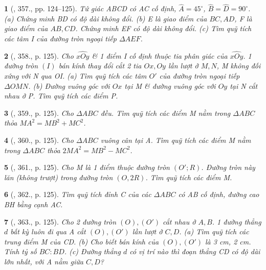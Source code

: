 \documentclass{article}
\newtheorem{baitoan}{}
\begin{document}
\begin{baitoan}[\cite{Binh_Toan_9_tap_2}, 357., pp. 124--125]
	Tứ giác ABCD có AC cố định, $\widehat{A} = 45^\circ$, $\widehat{B} = \widehat{D} = 90^\circ$. (a) Chứng minh BD có độ dài không đổi. (b) E là giao điểm của $BC,AD$, F là giao điểm của $AB,CD$. Chứng minh EF có độ dài không đổi. (c) Tìm quỹ tích các tâm I của đường tròn ngoại tiếp $\Delta AEF$.
\end{baitoan}

\begin{baitoan}[\cite{Binh_Toan_9_tap_2}, 358., p. 125]
	Cho $\widehat{xOy}$ \& 1 điểm I cố định thuộc tia phân giác của $\widehat{xOy}$. 1 đường tròn $(I)$ bán kính thay đổi cắt 2 tia $Ox,Oy$ lần lượt ở $M,N$, M không đối xứng với N qua OI. (a) Tìm quỹ tích các tâm $O'$ của đường tròn ngoại tiếp $\Delta OMN$. (b) Đường vuông góc với $Ox$ tại M \& đường vuông góc với $Oy$ tại N cắt nhau ở P. Tìm quỹ tích các điểm P.
\end{baitoan}

\begin{baitoan}[\cite{Binh_Toan_9_tap_2}, 359., p. 125]
	Cho $\Delta ABC$ đều. Tìm quỹ tích các điểm M nằm trong $\Delta ABC$ thỏa $MA^2 = MB^2 + MC^2$.
\end{baitoan}

\begin{baitoan}[\cite{Binh_Toan_9_tap_2}, 360., p. 125]
	Cho $\Delta ABC$ vuông cân tại A. Tìm quỹ tích các điểm M nằm trong $\Delta ABC$ thỏa $2MA^2 = MB^2 - MC^2$.
\end{baitoan}

\begin{baitoan}[\cite{Binh_Toan_9_tap_2}, 361., p. 125]
	Cho M là 1 điểm thuộc đường tròn $(O';R)$. Đường tròn này lăn (không trượt) trong đường tròn $(O,2R)$. Tìm quỹ tích các điểm M.
\end{baitoan}

\begin{baitoan}[\cite{Binh_Toan_9_tap_2}, 362., p. 125]
	Tìm quỹ tích đỉnh C của các $\Delta ABC$ có AB cố định, đường cao BH bằng cạnh AC.
\end{baitoan}

\begin{baitoan}[\cite{Binh_Toan_9_tap_2}, 363., p. 125]
	Cho 2 đường tròn $(O),(O')$ cắt nhau ở $A,B$. 1 đường thẳng $d$ bất kỳ luôn đi qua A cắt $(O),(O')$ lần lượt ở $C,D$. (a) Tìm quỹ tích các trung điểm M của CD. (b) Cho biết bán kính của $(O),(O')$ là {\rm3 cm, 2 cm}. Tính tỷ số $BC:BD$. (c) Đường thẳng $d$ có vị trí nào thì đoạn thẳng CD có độ dài lớn nhất, với A nằm giữa $C,D$?
\end{baitoan}
\end{document}

